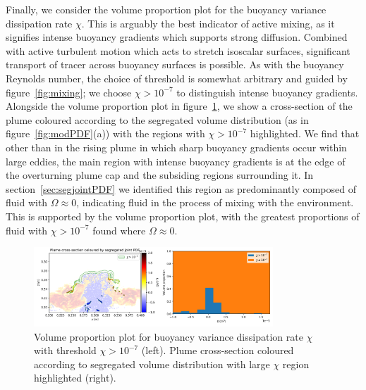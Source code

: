 \documentclass[a4paper]{article}
\begin{document}
Finally, we consider the volume proportion plot for the buoyancy variance dissipation rate $\chi$. This is
arguably the best indicator of active mixing, as it signifies intense buoyancy gradients which supports
strong diffusion. Combined with active turbulent motion which acts to stretch isoscalar surfaces,
significant transport of tracer across buoyancy surfaces is possible. As with the buoyancy Reynolds number,
the choice of threshold is somewhat arbitrary and guided by figure~\ref{fig:mixing}; we choose $\chi >
10^{-7}$ to distinguish intense buoyancy gradients. Alongside the volume proportion plot in
figure~\ref{fig:chi_vol}, we show a cross-section of the plume coloured according to the segregated volume distribution
(as in figure~\ref{fig:modPDF}(a)) with the regions with $\chi > 10^{-7}$ highlighted. We find that other than
in the rising plume in which sharp buoyancy gradients occur within large eddies, the main region with intense
buoyancy gradients is at the edge of the overturning plume cap and the subsiding regions surrounding it. In
section~\ref{sec:segjointPDF} we identified this region as predominantly composed of fluid with $\Omega
\approx 0$, indicating fluid in the process of mixing with the environment. This is supported by the volume
proportion plot, with the greatest proportions of fluid with $\chi > 10^{-7}$ found where $\Omega \approx 0$.

\begin{figure}
	\centering
	\includegraphics[width=0.8\textwidth]{chi_vol}
	\caption{Volume proportion plot for buoyancy variance dissipation rate $\chi$ with threshold $\chi >
		10^{-7}$ (left). Plume cross-section coloured according to segregated volume distribution with large $\chi$
		region highlighted (right).}
	\label{fig:chi_vol}
\end{figure}
\end{document}

